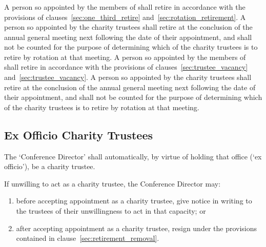         \subsubsection{}\label{sec:elected_trustee_retirement}
        A person so appointed by the members of \shortname{} shall retire in accordance with the provisions of clauses~\ref{sec:one_third_retire} and~\ref{sec:rotation_retirement}. A person so appointed by the charity trustees shall retire at the conclusion of the annual general meeting next following the date of their appointment, and shall not be counted for the purpose of determining which of the charity trustees is to retire by rotation at that meeting.
        A person so appointed by the members of \shortname{} shall retire in accordance with the provisions of clauses~\ref{sec:trustee_vacancy} and~\ref{sec:trustee_vacancy}. A person so appointed by the charity trustees shall retire at the conclusion of the annual general meeting next following the date of their appointment, and shall not be counted for the purpose of determining which of the charity trustees is to retire by rotation at that meeting.

    \subsection{Ex Officio Charity Trustees}
    The `Conference Director' shall automatically, by virtue of holding that office (`ex officio'), be a charity trustee.

    If unwilling to act as a charity trustee, the Conference Director may:
    \begin{enumerate}
        \item before accepting appointment as a charity trustee, give notice in writing to the trustees of their unwillingness to act in that capacity; or
        \item after accepting appointment as a charity trustee, resign under the provisions contained in clause~\ref{sec:retirement_removal}.
    \end{enumerate}
